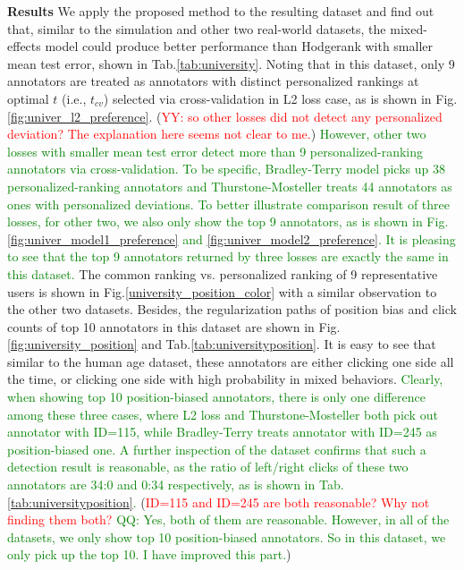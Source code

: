 \documentclass[10pt,journal,cspaper,compsoc]{IEEEtran}
\begin{document}
{\textbf{Results} We apply the proposed method to
the resulting dataset and find out that, similar to the simulation and other two real-world datasets, the mixed-effects model could produce better performance than Hodgerank with smaller mean test error, shown in Tab.\ref{tab:university}. Noting that in this dataset, only 9 annotators are treated as annotators with distinct personalized rankings at optimal $t$ (i.e., $t_{cv}$) selected via cross-validation in L2 loss case, as is shown in Fig.\ref{fig:univer_l2_preference}. (\textcolor{red}{YY: so other losses did not detect any personalized deviation? The explanation here seems not clear to me.}) \textcolor{green}{
However, other two losses with smaller mean test error detect more than 9 personalized-ranking annotators via cross-validation. To be specific, Bradley-Terry model picks up 38 personalized-ranking annotators and Thurstone-Mosteller treats 44 annotators as ones with personalized deviations.
To better illustrate comparison result of three losses, for other two, we also only show the top 9 annotators, as is shown in Fig.\ref{fig:univer_model1_preference} and \ref{fig:univer_model2_preference}. It is pleasing to see that the top 9 annotators returned by three losses are exactly the same in this dataset.}
The common ranking vs. personalized ranking of 9 representative users is shown in Fig.\ref{university_position_color} with a similar observation to the other two datasets.
Besides, the regularization paths of position bias and click counts of top 10 annotators in this dataset are shown in Fig.\ref{fig:university_position} and Tab.\ref{tab:universityposition}.
It is easy to see that similar to the human age dataset, these annotators are either clicking one
side all the time, or clicking one side with high probability in mixed behaviors. \textcolor{green}{Clearly, when showing top 10 position-biased annotators, there is only one difference among these three cases, where L2 loss and Thurstone-Mosteller both pick out annotator with ID=115, while Bradley-Terry treats annotator with ID=245 as position-biased one.
A further inspection of the dataset
confirms that such a detection result is reasonable, as the ratio of left/right clicks of these two annotators are 34:0 and 0:34 respectively, as is shown in Tab.\ref{tab:universityposition}. } (\textcolor{red}{ID=115 and ID=245 are both reasonable? Why not finding them both?} \textcolor{green}{QQ: Yes, both of them are reasonable. However, in all of the datasets, we only show top 10 position-biased annotators. So in this dataset, we only pick up the top 10. I have improved this part.})

}
\end{document}
